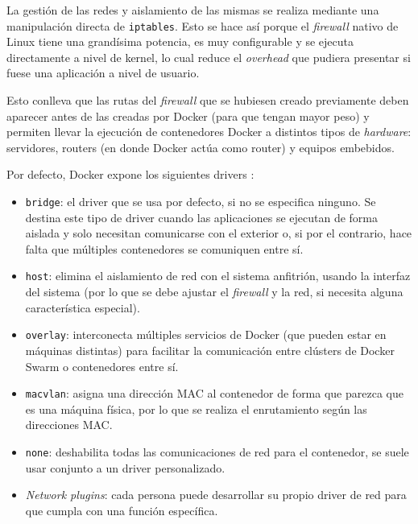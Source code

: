 La gestión de las redes y aislamiento de las mismas se realiza mediante una
manipulación directa de \texttt{iptables}. Esto se hace así porque el \textit{firewall}
nativo de Linux tiene una grandísima potencia, es muy configurable y se ejecuta
directamente a nivel de kernel, lo cual reduce el \textit{overhead} que pudiera
presentar si fuese una aplicación a nivel de usuario.

Esto conlleva que las rutas del \textit{firewall} que se hubiesen creado previamente
deben aparecer antes de las creadas por Docker (para que tengan mayor peso) y 
permiten llevar la ejecución de contenedores Docker a distintos tipos de \textit{hardware}:
servidores, routers (en donde Docker actúa como router) y equipos embebidos.

Por defecto, Docker expone los siguientes drivers \cite{NetworkingOverview2021}:

\begin{itemize}
    \item \texttt{bridge}: el driver que se usa por defecto, si no se especifica 
          ninguno. Se destina este tipo de driver cuando las aplicaciones se
          ejecutan de forma aislada y solo necesitan comunicarse con el exterior o,
          si por el contrario, hace falta que múltiples contenedores se comuniquen
          entre sí.

    \item \texttt{host}: elimina el aislamiento de red con el sistema anfitrión,
          usando la interfaz del sistema (por lo que se debe ajustar
          el \textit{firewall} y la red, si necesita alguna característica especial).
        
    \item \texttt{overlay}: interconecta múltiples servicios de Docker (que pueden
          estar en máquinas distintas) para facilitar la comunicación entre clústers
          de Docker Swarm o contenedores entre sí.

    \item \texttt{macvlan}: asigna una dirección MAC al contenedor de forma que parezca
          que es una máquina física, por lo que se realiza el enrutamiento según las
          direcciones MAC.

    \item \texttt{none}: deshabilita todas las comunicaciones de red para el
          contenedor, se suele usar conjunto a un driver personalizado.

    \item \textit{Network plugins}: cada persona puede desarrollar su propio
          driver de red para que cumpla con una función específica.
\end{itemize}

